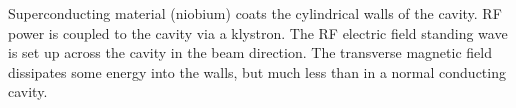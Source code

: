 \documentclass[dissertation.tex]{subfiles}
\begin{document}
Superconducting material (niobium) coats the cylindrical walls of the cavity.  RF power is coupled to the cavity via a klystron.  The RF electric field standing wave is set up across the cavity in the beam direction.  The transverse magnetic field dissipates some energy into the walls, but much less than in a normal conducting cavity.
\end{document}
